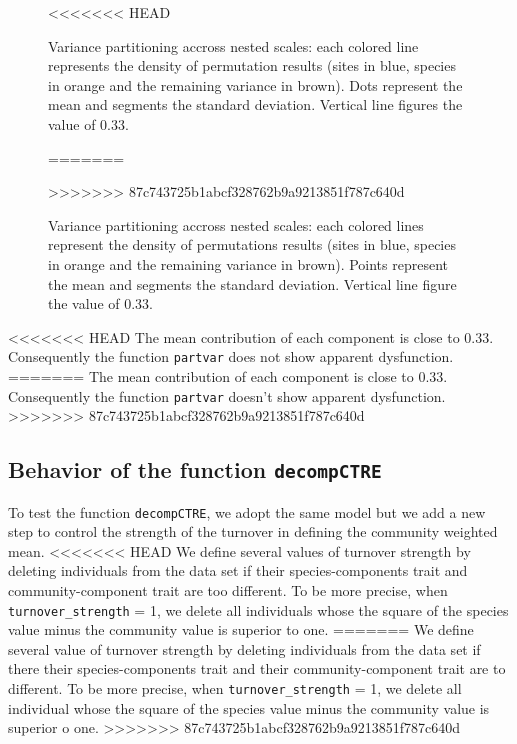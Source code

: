 \documentclass[12pt]{article}\usepackage[]{graphicx}\usepackage[]{color}
\newenvironment{knitrout}{}{} %
\begin{document}
\begin{landscape}
\begin{table}[ht]
{\begin{table}[ht]
{\begin{table}[ht]
{\begin{table}[h!]
\begin{center}
\begin{knitrout}
\begin{figure}
{}

<<<<<<< HEAD
\caption[Variance partitioning accross nested scales]{Variance partitioning accross nested scales: each colored line represents the density of permutation results (sites in blue, species in orange and the remaining variance in brown). Dots represent the mean and segments the standard deviation. Vertical line figures the value of 0.33.}\label{fig:Partvar_plot}
=======
\caption[Variance partitioning accross nested scales]{Variance partitioning accross nested scales: each colored lines represent the density of permutations results (sites in blue, species in orange and the remaining variance in brown). Points represent the mean and segments the standard deviation. Vertical line figure the value of 0.33.}\label{fig:Partvar_plot}
>>>>>>> 87c743725b1abcf328762b9a9213851f787c640d
\end{figure}


\end{knitrout}

<<<<<<< HEAD
The mean contribution of each component is close to 0.33. Consequently the function \texttt{partvar} does not show apparent dysfunction.
=======
The mean contribution of each component is close to 0.33. Consequently the function \texttt{partvar} doesn't show apparent dysfunction.
>>>>>>> 87c743725b1abcf328762b9a9213851f787c640d

\subsection{Behavior of the function \texttt{decompCTRE}}

To test the function \texttt{decompCTRE}, we adopt the same model but we add a new step to control the strength of the turnover in defining the community weighted mean.
<<<<<<< HEAD
We define several values of turnover strength by deleting individuals from the data set if their species-components trait and community-component trait are too different. To be more precise, when \texttt{turnover\_strength} = 1, we delete all individuals whose the square of the species value minus the community value is superior to one. 
=======
We define several value of turnover strength by deleting individuals from the data set if there their species-components trait and their community-component trait are to different. To be more precise, when \texttt{turnover\_strength} = 1, we delete all individual whose the square of the species value minus the community value is superior o one. 
>>>>>>> 87c743725b1abcf328762b9a9213851f787c640d


\end{center}
\end{table}}
\end{table}}
\end{table}}
\end{table}
\end{landscape}
\end{document}
